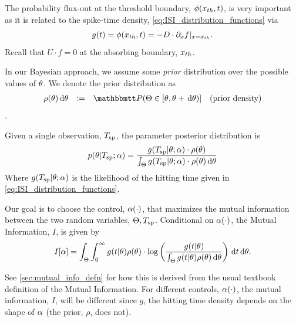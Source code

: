 The probability flux-out at the threshold boundary, $\phi({ x_{th} }, t)$, is very
important as it is related to the spike-time density,
\cref{eq:ISI_distribution_functions} via 
$$g(t)  = \phi({ x_{th} }, t) = -D\cdot {\partial}_x
f|_{x={ x_{th} }}.$$
Recall that $U \cdot f = 0$ at the absorbing boundary, ${ x_{th} }$.



In our Bayesian approach, we assume some {\sl  prior} distribution over
the possible values of ${ \theta}$. We denote the prior distribution as
$$
\begin{array}{rcll} 
\rho(\th) \intd{\th} &:=& \Prob(\Theta \in [\th, \th + \intd{\th})  ] &
 \textrm{(prior density)} 
 \end{array}
$$.

Given a single observation, ${ T_{\textrm{sp} } }$, the parameter posterior 
distribution is 
\begin{equation}
p({ \theta}| { T_{\textrm{sp} } }; \alpha) =
\frac{g({ T_{\textrm{sp} } } |{ \theta}; \alpha)\cdot \rho({ \theta})}{\int_\Theta g({ T_{\textrm{sp} } }|{ \theta}; \alpha)\cdot \rho({ \theta})
\, \mathrm{d} { \theta}}
\label{eq:parameter_posterior_defn}
\end{equation} 
Where $ g( { T_{\textrm{sp} } } |{ \theta}; \alpha)$ is the likelihood of the hitting time given in
\cref{eq:ISI_distribution_functions}.

Our goal is to choose the control, $\alpha(\cdot)$, that maximizes the mutual
information  between the two random variables, ${\Theta}, { T_{\textrm{sp} } }$. Conditional on
$\alpha(\cdot)$, the Mutual Information, $I$, is given by
\begin{equation}
I[\alpha]= 
\int_\Theta \int_0^\infty g(t|{ \theta})\rho({ \theta}) \cdot 
\log \left( \frac{g(t|{ \theta})}
{\int_\Theta g(t|{ \theta})\rho({ \theta}) \, \mathrm{d} { \theta}   } \right)
\, \mathrm{d} t\, \mathrm{d} { \theta}.
\label{eq:J_mutual_info_objective}
\end{equation}

See \cref{sec:mutual_info_defn} for how this is derived from the usual textbook
definition of the Mutual Information. For different controls, $\alpha(\cdot)$,
the mutual information, $I$, will be different since $g$, the hitting time
density depends on the shape of $\alpha$ (the prior, $\rho$, does not). 
  
